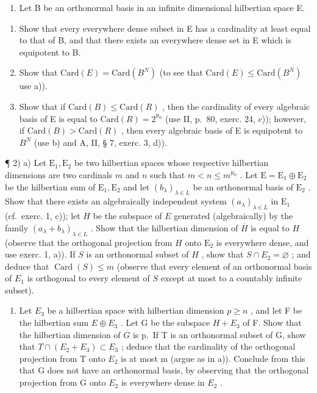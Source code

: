 \exercisegroup

\begin{enumerate}
\def\labelenumi{\arabic{enumi})}
\tightlist
\item
  Let B be an orthonormal basis in an infinite dimensional hilbertian space E.
\end{enumerate}

\begin{enumerate}
\def\labelenumi{\alph{enumi})}
\tightlist
\item
  Show that every everywhere dense subset in E has a cardinality at least equal to that of B, and that there exists an everywhere dense set in E which is equipotent to B.
\item
  Show that \(\text{Card}(E) = \text{Card}(B^{N})\) (to see that \(\text{Card}(E) \leqslant \text{Card}(B^{N})\) use a)).
\item
  Show that if \(\text{Card}(B) \leqslant \text{Card}(R)\) , then the cardinality of every algebraic basis of E is equal to \(\text{Card}(R) = 2^{\aleph_{0}}\) (use II, p.~80, exerc. 24, c)); however, if \(\text{Card}(B) > \text{Card}(R)\) , then every algebraic basis of E is equipotent to \(B^{N}\) (use b) and A, II, § 7, exerc. 3, d)).
\end{enumerate}

¶ 2) a) Let \(\mathrm{E}_1, \mathrm{E}_2\) be two hilbertian spaces whose respective hilbertian dimensions are two cardinals \(m\) and \(n\) such that \(m < n \leqslant m^{\aleph_{0}}\) . Let \(\mathrm{E} = \mathrm{E}_1 \oplus \mathrm{E}_2\) be the hilbertian sum of \(\mathrm{E}_1, \mathrm{E}_2\) and let \((b_\lambda)_{\lambda \in L}\) be an orthonormal basis of \(\mathrm{E}_2\) . Show that there exists an algebraically independent system \((a_\lambda)_{\lambda \in L}\) in \(\mathrm{E}_1\) (cf.~exerc. 1, c)); let \(H\) be the subspace of \(E\) generated (algebraically) by the family \((a_\lambda + b_\lambda)_{\lambda \in L}\) . Show that the hilbertian dimension of \(\overline{H}\) is equal to \(H\) (observe that the orthogonal projection from \(H\) onto \(\mathrm{E}_2\) is everywhere dense, and use exerc. 1, a)). If \(S\) is an orthonormal subset of \(H\) , show that \(S \cap E_2 = \varnothing\) ; and deduce that \(\operatorname{Card}(S) \leqslant m\) (observe that every element of an orthonormal basis of \(E_1\) is orthogonal to every element of \(S\) except at most to a countably infinite subset).

\begin{enumerate}
\def\labelenumi{\alph{enumi})}
\setcounter{enumi}{1}
\tightlist
\item
  Let \(E_{3}\) be a hilbertian space with hilbertian dimension \(p \geqslant n\) , and let F be the hilbertian sum \(E \oplus E_{3}\) . Let G be the subspace \(H + E_{3}\) of F. Show that the hilbertian dimension of \(\overline{G}\) is p.~If T is an orthonormal subset of G, show that \(T \cap (E_{2} + E_{3}) \subset E_{3}\) ; deduce that the cardinality of the orthogonal projection from T onto \(E_{2}\) is at most m (argue as in a)). Conclude from this that G does not have an orthonormal basis, by observing that the orthogonal projection from G onto \(E_{2}\) is everywhere dense in \(E_{2}\) .
\end{enumerate}

